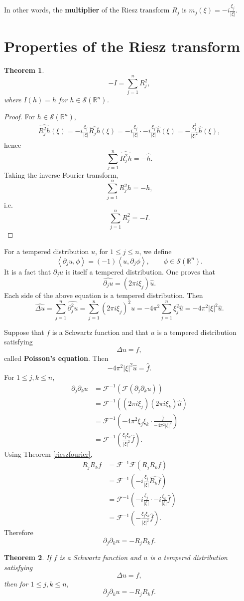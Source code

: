 \documentclass{article}
\newcommand{\inner}[2]{\left\langle #1, #2 \right\rangle}
\newtheorem{theorem}{Theorem}
\theoremstyle{definition}
\begin{document}
In other words, the \textbf{multiplier} of the Riesz transform $R_j$ is $m_j(\xi) =  -i\frac{\xi_j}{|\xi|}$. 


\section{Properties of the Riesz transform}
\begin{theorem}
\[
-I = \sum_{j=1}^n R_j^2,
\]
where $I(h)  = h$ for $h \in \mathscr{S}(\mathbb{R}^n)$.
\end{theorem}
\begin{proof}
For $h \in \mathscr{S}(\mathbb{R}^n)$,
\begin{align*}
\widehat{R_j^2 h}(\xi) = -i\frac{\xi_j}{|\xi|} \widehat{R_j h}(\xi)
=-i\frac{\xi_j}{|\xi|} \cdot -i\frac{\xi_j}{|\xi|} \widehat{h}(\xi)
=-\frac{\xi_j^2}{|\xi|^2} \widehat{h}(\xi),
\end{align*}
hence
\[
\sum_{j=1}^n \widehat{R_j^2 h}  = -\widehat{h}.
\]
Taking the inverse Fourier transform,
\[
\sum_{j=1}^n R_j^2 h  = -h,
\]
i.e.
\[
\sum_{j=1}^n R_j^2 = -I.
\]
\end{proof}


For a tempered distribution $u$, for $1 \leq j \leq n$, we define
\[
\inner{\partial_j u}{\phi} = (-1) \inner{u}{\partial_j \phi},\qquad \phi \in \mathscr{S}(\mathbb{R}^n).
\]
It is a fact that $\partial_j u$ is itself a tempered distribution. 
One proves that
\[
\widehat{\partial_j u} = (2\pi i\xi_j) \widehat{u}.
\]
Each side of the above equation is a tempered distribution. Then
\[
\widehat{\Delta u} = \sum_{j=1}^n \widehat{\partial_j^2 u}
=\sum_{j=1}^n (2\pi i\xi_j)^2 \widehat{u}
=-4\pi^2  \sum_{j=1}^n \xi_j^2 \widehat{u}
=-4\pi^2 |\xi|^2 \widehat{u}.
\]

Suppose that $f$ is a Schwartz function and that $u$ is a tempered distribution satisfying
\[
\Delta u = f,
\]
called \textbf{Poisson's equation}.
Then
\[
-4\pi^2 |\xi|^2 \widehat{u} = \widehat{f}.
\]
For $1 \leq j,k \leq n$,
\begin{align*}
\partial_j \partial_k u&=\mathscr{F}^{-1}(\mathscr{F}(\partial_j\partial_k u))\\
&=\mathscr{F}^{-1}((2\pi i\xi_j)(2\pi i\xi_k) \widehat{u})\\
&=\mathscr{F}^{-1}\left( -4\pi^2 \xi_j \xi_k \cdot \frac{\widehat{f}}{-4\pi^2 |\xi|^2}\right)\\
&=\mathscr{F}^{-1}\left(\frac{\xi_j \xi_k}{|\xi|^2} \widehat{f}\right).
\end{align*}
Using Theorem \ref{rieszfourier},
\begin{align*}
R_j R_k f &= \mathscr{F}^{-1} \mathscr{F}(R_j R_k f)\\
&=\mathscr{F}^{-1}\left( -i\frac{\xi_j}{|\xi|} \widehat{R_k f}\right)\\
&=\mathscr{F}^{-1}\left( -i\frac{\xi_j}{|\xi|} \cdot -i\frac{\xi_k}{|\xi|} \widehat{f}\right)\\
&=\mathscr{F}^{-1}\left(-\frac{\xi_j \xi_k}{|\xi|^2} \widehat{f}\right).
\end{align*}
Therefore
\[
\partial_j \partial_k u = -R_j R_k f.
\]

\begin{theorem}
If $f$ is a Schwartz function and $u$ is a tempered distribution satisfying
\[
\Delta u =f,
\]
then for $1 \leq j,k \leq n$,
\[
\partial_j \partial_k u = -R_j R_k f.
\]
\end{theorem}
\end{document}
